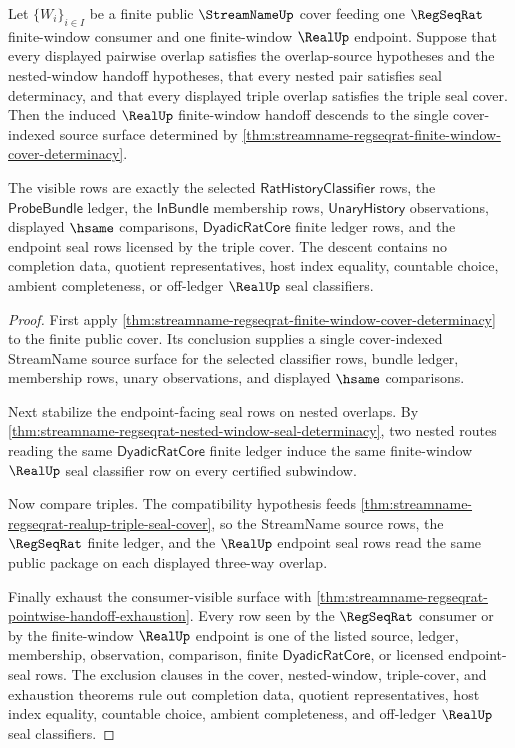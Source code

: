 \begin{theorem}
\label{thm:streamname-regseqrat-cover-real-handoff-descent}
Let $\{W_i\}_{i\in I}$ be a finite public $\StreamNameUp$ cover feeding one
$\RegSeqRat$ finite-window consumer and one finite-window $\RealUp$ endpoint.
Suppose that every displayed pairwise overlap satisfies the overlap-source
hypotheses and the nested-window handoff hypotheses, that every nested pair
satisfies seal determinacy, and that every displayed triple overlap satisfies
the triple seal cover. Then the induced $\RealUp$ finite-window handoff descends
to the single cover-indexed source surface determined by
\autoref{thm:streamname-regseqrat-finite-window-cover-determinacy}.

The visible rows are exactly the selected $\mathsf{RatHistoryClassifier}$ rows,
the $\mathsf{ProbeBundle}$ ledger, the $\mathsf{InBundle}$ membership rows,
$\mathsf{UnaryHistory}$ observations, displayed $\hsame$ comparisons,
$\mathsf{DyadicRatCore}$ finite ledger rows, and the endpoint seal rows licensed
by the triple cover. The descent contains no completion data, quotient
representatives, host index equality, countable choice, ambient completeness, or
off-ledger $\RealUp$ seal classifiers.
\end{theorem}
\begin{proof}
First apply
\autoref{thm:streamname-regseqrat-finite-window-cover-determinacy} to the finite
public cover. Its conclusion supplies a single cover-indexed StreamName source
surface for the selected classifier rows, bundle ledger, membership rows, unary
observations, and displayed $\hsame$ comparisons.

Next stabilize the endpoint-facing seal rows on nested overlaps. By
\autoref{thm:streamname-regseqrat-nested-window-seal-determinacy}, two nested
routes reading the same $\mathsf{DyadicRatCore}$ finite ledger induce the same
finite-window $\RealUp$ seal classifier row on every certified subwindow.

Now compare triples. The compatibility hypothesis feeds
\autoref{thm:streamname-regseqrat-realup-triple-seal-cover}, so the StreamName
source rows, the $\RegSeqRat$ finite ledger, and the $\RealUp$ endpoint seal
rows read the same public package on each displayed three-way overlap.

Finally exhaust the consumer-visible surface with
\autoref{thm:streamname-regseqrat-pointwise-handoff-exhaustion}. Every row seen
by the $\RegSeqRat$ consumer or by the finite-window $\RealUp$ endpoint is one of
the listed source, ledger, membership, observation, comparison, finite
$\mathsf{DyadicRatCore}$, or licensed endpoint-seal rows. The exclusion clauses
in the cover, nested-window, triple-cover, and exhaustion theorems rule out
completion data, quotient representatives, host index equality, countable
choice, ambient completeness, and off-ledger $\RealUp$ seal classifiers.
\end{proof}

